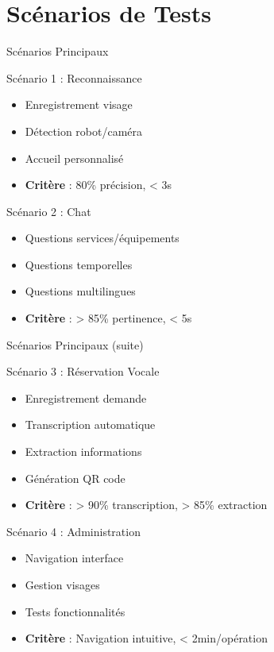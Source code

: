\documentclass[aspectratio=169,11pt]{beamer}
\begin{document}

\section{Scénarios de Tests}

\begin{frame}{Scénarios Principaux}
\begin{block}{Scénario 1 : Reconnaissance}
\begin{itemize}
    \item Enregistrement visage
    \item Détection robot/caméra
    \item Accueil personnalisé
    \item \textbf{Critère} : 80\% précision, < 3s
\end{itemize}
\end{block}

\begin{block}{Scénario 2 : Chat}
\begin{itemize}
    \item Questions services/équipements
    \item Questions temporelles
    \item Questions multilingues
    \item \textbf{Critère} : > 85\% pertinence, < 5s
\end{itemize}
\end{block}
\end{frame}

\begin{frame}{Scénarios Principaux (suite)}
\begin{block}{Scénario 3 : Réservation Vocale}
\begin{itemize}
    \item Enregistrement demande
    \item Transcription automatique
    \item Extraction informations
    \item Génération QR code
    \item \textbf{Critère} : > 90\% transcription, > 85\% extraction
\end{itemize}
\end{block}

\begin{block}{Scénario 4 : Administration}
\begin{itemize}
    \item Navigation interface
    \item Gestion visages
    \item Tests fonctionnalités
    \item \textbf{Critère} : Navigation intuitive, < 2min/opération
\end{itemize}
\end{block}
\end{frame}
\end{document}

